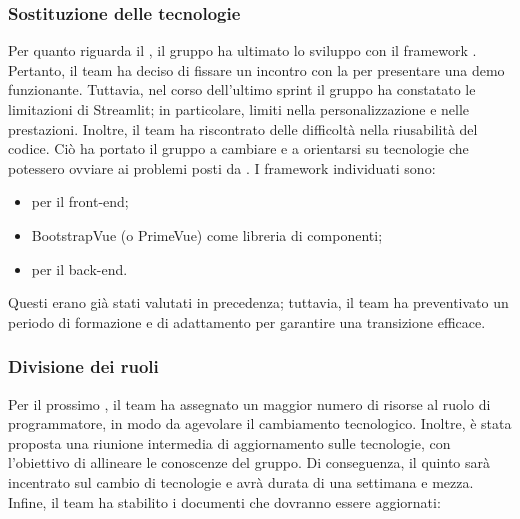 \subsubsection{Sostituzione delle tecnologie}
\par Per quanto riguarda il , il gruppo ha ultimato lo sviluppo con il framework . Pertanto, il team ha deciso di fissare un incontro con la  per presentare una demo funzionante.
Tuttavia, nel corso dell'ultimo sprint il gruppo ha constatato le limitazioni di Streamlit; in particolare, limiti nella personalizzazione e nelle prestazioni. Inoltre, il team ha riscontrato delle difficoltà nella riusabilità del codice.
Ciò ha portato il gruppo a cambiare  e a orientarsi su tecnologie che potessero ovviare ai problemi posti da .
I framework individuati sono:
\begin{itemize}
	\item {} per il front-end;
	\item BootstrapVue (o PrimeVue) come libreria di componenti;
	\item {} per il back-end.
\end{itemize}

\vspace{0.5\baselineskip}
\par Questi  erano già stati valutati in precedenza; tuttavia, il team ha preventivato un periodo di formazione e di adattamento per garantire una transizione efficace.

\subsubsection{Divisione dei ruoli}
\par Per il prossimo , il team ha assegnato un maggior numero di risorse al ruolo di programmatore, in modo da agevolare il cambiamento tecnologico.
Inoltre, è stata proposta una riunione intermedia di aggiornamento sulle tecnologie, con l'obiettivo di allineare le conoscenze del gruppo.
Di conseguenza, il quinto  sarà incentrato sul cambio di tecnologie e avrà durata di una settimana e mezza.
Infine, il team ha stabilito i documenti che dovranno essere aggiornati:

